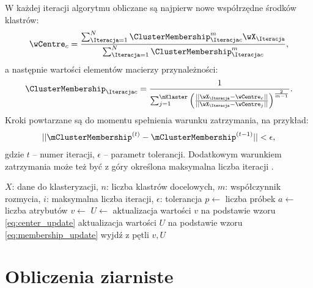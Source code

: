 \documentclass[a4paper,twoside,12pt]{book}
\begin{document}
W każdej iteracji algorytmu obliczane są najpierw nowe współrzędne środków klastrów:
\begin{align}
	\label{eq:center_update}
	\wCentre_{\klaster} = \frac{\sum_{\Iteracja=1}^{N} \ClusterMembership_{\Iteracja\klaster}^{m} \wX_{\Iteracja}}{\sum_{\Iteracja=1}^{N} \ClusterMembership_{\Iteracja\klaster}^{m}},
\end{align}
a następnie wartości elementów macierzy przynależności:
\begin{align}
	\label{eq:membership_update}
	\ClusterMembership_{\Iteracja\klaster} = \frac{1}{\sum_{j=1}^{\nKlaster}\left( \frac{||\wX_{\Iteracja} - \wCentre_{\klaster}||}{||\wX_{\Iteracja} - \wCentre_{j}||} \right)^{\frac{2}{m - 1}}}.
\end{align}
Kroki powtarzane są do momentu spełnienia warunku zatrzymania, na przykład:
\begin{align}
	\label{eq:fcm_stop_contidion}
	||\mClusterMembership^{(t)} - \mClusterMembership^{(t-1)}|| < \epsilon,
\end{align}
%
gdzie $t$ -- numer iteracji, $\epsilon$ -- parametr tolerancji. Dodatkowym warunkiem zatrzymania może też być z góry określona maksymalna liczba iteracji \cite{bib:scikit-fuzzy-cmeans-docs-fcm, bib:skfuzzy-docs-fcm}.

\begin{algorithm}[t]
	\caption{Algorytm rozmytych $c$ średnich}
	\label{alg:fcm}
	\begin{algorithmic}[1]
		\Require $X$: dane do klasteryzacji, $n$: liczba klastrów docelowych, $m$: współczynnik rozmycia, $i$: maksymalna liczba iteracji, $\epsilon$: tolerancja
		\State $p \gets $ liczba próbek 
		\State $a \gets $ liczba atrybutów 
		\State $v \gets $  
		\State $U \gets $  
		\State aktualizacja wartości $v$ na podstawie wzoru \ref{eq:center_update}
		\State aktualizacja wartości $U$ na podstawie wzoru \ref{eq:membership_update}
		\State wyjdź z pętli
		\EndIf
		\EndFor
		\State \Return $v, U$
		\EndProcedure
	\end{algorithmic}
\end{algorithm}

\section{Obliczenia ziarniste}
\end{document}
